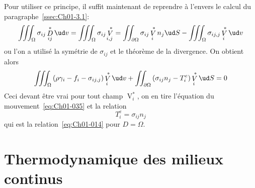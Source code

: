 Pour utiliser ce principe, il suffit maintenant de reprendre à l'envers le calcul du paragraphe~\ref{ssec:Ch01-3.1}:
\begin{equation*}
    \iiint_{\Omega} \sigma_{ij} \mathop{D}^{\ast}_{ij} \ud v = \iiint_{\Omega} \sigma_{ij} \mathop{V}^{\ast}_{i,j} = \iint_{\partial \Omega} \sigma_{ij} \mathop{V}^{\ast}_{i} n_j \ud S - \iiint_{\Omega} \sigma_{ij,j} \mathop{V}^{\ast}_{i} \ud v
\end{equation*}
ou l'on a utilisé la symétrie de $\sigma_{ij}$ et le théorème de la divergence.
On obtient alors
\begin{displaymath}
    \iiint_{\Omega} \left( \rho \gamma_i -f_i - \sigma_{ij,j} \right) \mathop{V}^{\ast}_i \ud v + \iint_{\partial \Omega} \left( \sigma_{ij} n_j - T_i^e \right) \mathop{V}^{\ast}_i \ud S = 0
\end{displaymath}
Ceci devant être vrai pour tout champ $\mathop{V}^{\ast}_i$, on en tire l'équation du mouvement~\eqref{eq:Ch01-035} et la relation
\begin{equation}
    T_i^e = \sigma_{ij} n_j
    \label{eq:Ch01-039}
\end{equation}
qui est la relation~\eqref{eq:Ch01-014} pour $D=\Omega$. 

\section{Thermodynamique des milieux continus} \label{sec:Ch01-3}
